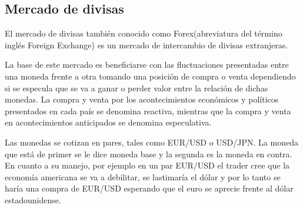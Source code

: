 %

\subsection{Mercado de divisas}
El mercado de divisas también conocido como Forex(abreviatura del término
inglés Foreign Exchange) es un mercado de intercambio de divisas extranjeras.

La base de este mercado es beneficiarse con las fluctuaciones presentadas entre
una moneda frente a otra tomando una posición de compra o venta dependiendo si
se especula que se va a ganar o perder valor entre la relación de dichas
monedas. La compra y venta por los acontecimientos económicos y políticos
presentados en cada país se denomina reactiva, mientras que la compra y venta
en acontecimientos anticipados se denomina especulativa. 

Las monedas se cotizan en pares, tales como EUR/USD o USD/JPN. La moneda que
está de primer se le dice moneda base y la segunda es la moneda en contra. En
cuanto a su manejo, por ejemplo en un par EUR/USD el trader cree que la
economía americana se va a debilitar, se lastimaría el dólar y por lo tanto se
haría una compra de EUR/USD esperando que el euro se aprecie frente al dólar
estadounidense. 

